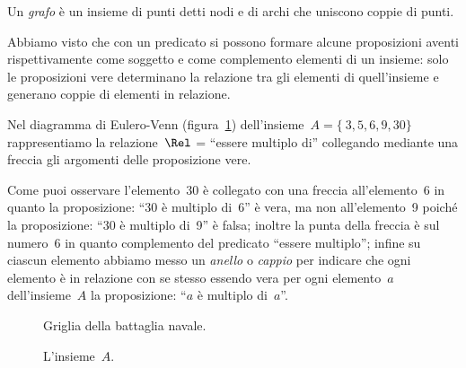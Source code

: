 \begin{definizione}
Un \emph{grafo} è un insieme di punti detti nodi e di archi che uniscono coppie 
di punti.
\end{definizione}

Abbiamo visto che con un predicato si possono formare alcune proposizioni aventi 
rispettivamente come soggetto e
come complemento elementi di un insieme: solo le proposizioni vere determinano 
la relazione tra gli elementi di
quell'insieme e generano coppie di elementi in relazione.

\begin{exrig}
 \begin{esempio}

Nel diagramma di Eulero-Venn (figura~\ref{fig:B.2}) dell'insieme~$A = \lbrace~3, 
5, 6, 9, 30 \rbrace$
rappresentiamo la relazione~$\Rel$ = ``essere multiplo di'' collegando mediante 
una freccia gli argomenti delle proposizione vere.


Come puoi osservare l'elemento~30 è collegato con una freccia all'elemento~6 in 
quanto la proposizione: ``30 è multiplo di~6'' è vera, ma non all'elemento~9
poiché la proposizione: ``30 è multiplo di~9'' è falsa; inoltre la punta della 
freccia è sul numero~6 in quanto complemento del predicato ``essere multiplo'';
infine su ciascun elemento abbiamo messo un \emph{anello} o \emph{cappio} per 
indicare che ogni elemento è in relazione con se stesso essendo vera per ogni
elemento~$a$ dell'insieme~$A$ la proposizione: ``$a$ è multiplo di~$a$''.

 \end{esempio}
\end{exrig}


\begin{inaccessibleblock}
 \begin{figure}[b]
\begin{minipage}[t]{.45\textwidth}
 \centering
 
 \caption{Griglia della battaglia navale.}\label{fig:B.1}
\end{minipage}\hfil
\begin{minipage}[t]{.45\textwidth}
 \centering
 
 \caption{L'insieme~$A$.}\label{fig:B.2}
\end{minipage}
\end{figure}
\end{inaccessibleblock}

